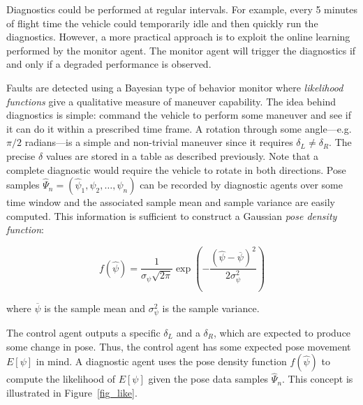 Diagnostics could be performed at regular intervals. For example, every 5 minutes of flight time the vehicle could temporarily idle and then quickly run the diagnostics. However, a more practical approach is to exploit the online learning performed by the monitor agent. The monitor agent will trigger the diagnostics if and only if a degraded performance is observed.

Faults are detected using a Bayesian type of behavior monitor where \textit{likelihood functions} give a qualitative measure of maneuver capability. The idea behind diagnostics is simple: command the vehicle to perform some maneuver and see if it can do it within a prescribed time frame. A rotation through some angle---e.g. $\pi/2$ radians---is a simple and non-trivial maneuver since it requires $\delta_L \neq \delta_R$. The precise $\delta$ values are stored in a table as described previously. Note that a complete diagnostic would require the vehicle to rotate in both directions. Pose samples $\hat{\Psi}_n = (\hat{\psi}_1, \hat{\psi}_2, \ldots, \hat{\psi}_n )$ can be recorded by diagnostic agents over some time window and the associated sample mean and sample variance are easily computed. This information is sufficient to construct a Gaussian \textit{pose density function}:

\begin{equation}
f(\hat{\psi}) = \frac{1}{\sigma_\psi \sqrt{2\pi}}\exp \left( -\frac{(\hat{\psi} - \overline{\psi})^2}{2\sigma_\psi^2} \right)
\label{eq-like}
\end{equation}

\noindent where $\overline{\psi}$ is the sample mean and $\sigma^2_\psi$ is the sample variance.

The control agent outputs a specific $\delta_L$ and a $\delta_R$, which are expected to produce some change in pose. Thus, the control agent has some expected pose movement $E[\psi]$ in mind. A diagnostic agent uses the pose density function $f(\hat{\psi})$ to compute the likelihood of $E[\psi]$ given the pose data samples $\hat{\Psi}_n$. This concept is illustrated in Figure~\ref{fig_like}.

